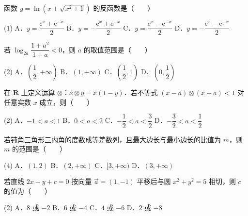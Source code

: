 \begin{question}
函数 $y = \ln\left(x + \sqrt{x^2+1}\right)$ 的反函数是\mbox{（　　）}

\begin{gkopts}(1)
\task A．$y = \dfrac{\mathrm{e}^x + \mathrm{e}^{-x}}{2}$
\task B．$y = -\dfrac{\mathrm{e}^x + \mathrm{e}^{-x}}{2}$
\task C．$y = \dfrac{\mathrm{e}^x - \mathrm{e}^{-x}}{2}$
\task D．$y = -\dfrac{\mathrm{e}^x - \mathrm{e}^{-x}}{2}$
\end{gkopts}

\end{question}
\begin{question}
若 $\log_{2a}\dfrac{1+a^2}{1+a} < 0$，则 $a$ 的取值范围是\mbox{（　　）}

\begin{gkopts}(2)
\task A．$\left(\dfrac{1}{2}, +\infty\right)$
\task B．$(1, +\infty)$
\task C．$\left(\dfrac{1}{2}, 1\right)$
\task D．$\left(0, \dfrac{1}{2}\right)$
\end{gkopts}

\end{question}
\begin{question}
在 $\mathbf{R}$ 上定义运算 $\otimes$：$x \otimes y = x(1-y)$．若不等式 $(x-a) \otimes (x+a) < 1$ 对任意实数 $x$ 成立，则\mbox{（　　）}

\begin{gkopts}(2)
\task A．$-1 < a < 1$
\task B．$0 < a < 2$
\task C．$-\dfrac{1}{2} < a < \dfrac{3}{2}$
\task D．$-\dfrac{3}{2} < a < \dfrac{1}{2}$
\end{gkopts}

\end{question}
\begin{question}
若钝角三角形三内角的度数成等差数列，且最大边长与最小边长的比值为 $m$，则 $m$ 的范围是\mbox{（　　）}

\begin{gkopts}(4)
\task A．$(1, 2)$
\task B．$(2, +\infty)$
\task C．$[3, +\infty)$
\task D．$(3, +\infty)$
\end{gkopts}

\end{question}
\begin{question}
若直线 $2x - y + c = 0$ 按向量 $\vec{a} = (1, -1)$ 平移后与圆 $x^2 + y^2 = 5$ 相切，则 $c$ 的值为\mbox{（　　）}

\begin{gkopts}(2)
\task A．$8$ 或 $-2$
\task B．$6$ 或 $-4$
\task C．$4$ 或 $-6$
\task D．$2$ 或 $-8$
\end{gkopts}

\end{question}
